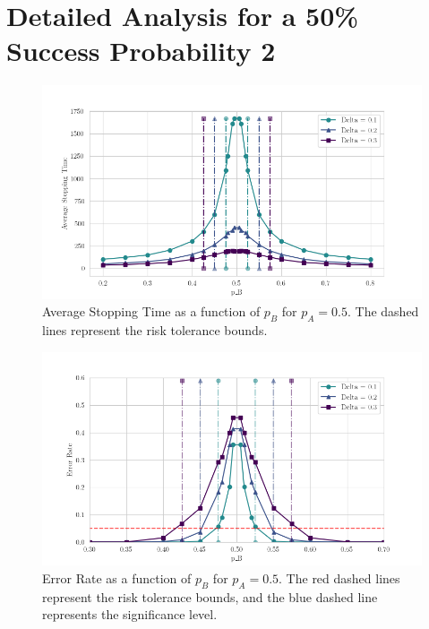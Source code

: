 \documentclass[magisterska, english]{pwr_wmat_praca_dyplomowa}
\theoremstyle{plain}
\numberwithin{theorem}{chapter}
\theoremstyle{definition}
\numberwithin{theorem}{chapter}
\begin{document}
\section{Detailed Analysis for a 50\% Success Probability 2}

\begin{figure}[H]
	\centering
	\includegraphics[width=\textwidth]{images/delta_average_stopping_time.png}
	\caption{Average Stopping Time as a function of \( p_B \) for \( p_A = 0.5 \). The dashed lines represent the risk tolerance bounds.}
	\label{fig:avg_stopping_time_pa05}
\end{figure}

\begin{figure}[H]
	\centering
	\includegraphics[width=\textwidth]{images/delta_error_rate.png}
	\caption{Error Rate as a function of \( p_B \) for \( p_A = 0.5 \). The red dashed lines represent the risk tolerance bounds, and the blue dashed line represents the significance level.}
	\label{fig:error_rate_pa05}
\end{figure}
\end{document}

